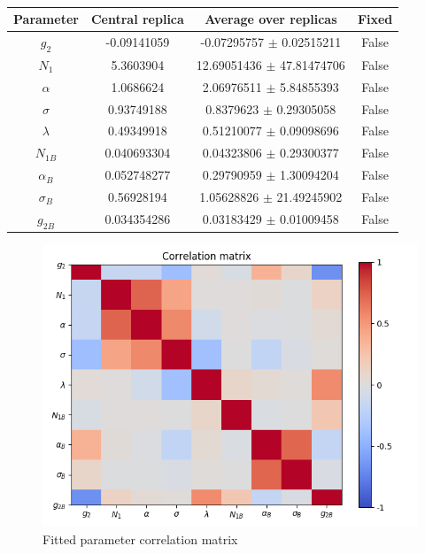 \documentclass[
]{article}
\begin{document}
\begin{table}[h]

\centering

\begin{tabular}{|c|c|c|c|} \hline

\textbf{Parameter} & \textbf{Central replica} & \textbf{Average over
replicas} & \textbf{Fixed} \\ \hline

\(g_2\) & -0.09141059 & -0.07295757 \(\pm\) 0.02515211 & False \\ \hline
\(N_1\) & 5.3603904 & 12.69051436 \(\pm\) 47.81474706 & False \\ \hline
\(\alpha\) & 1.0686624 & 2.06976511 \(\pm\) 5.84855393 & False \\ \hline
\(\sigma\) & 0.93749188 & 0.8379623 \(\pm\) 0.29305058 & False \\ \hline
\(\lambda\) & 0.49349918 & 0.51210077 \(\pm\)
0.09098696 & False \\ \hline
\(N_{1B}\) & 0.040693304 & 0.04323806 \(\pm\)
0.29300377 & False \\ \hline
\(\alpha_B\) & 0.052748277 & 0.29790959 \(\pm\)
1.30094204 & False \\ \hline
\(\sigma_B\) & 0.56928194 & 1.05628826 \(\pm\)
21.49245902 & False \\ \hline
\(g_{2B}\) & 0.034354286 & 0.03183429 \(\pm\)
0.01009458 & False \\ \hline

\end{tabular}

\caption{}

\end{table}

\begin{figure}
\centering
\includegraphics{pngplots/CorrelationMatrix.png}
\caption{Fitted parameter correlation matrix}
\end{figure}
\end{document}
